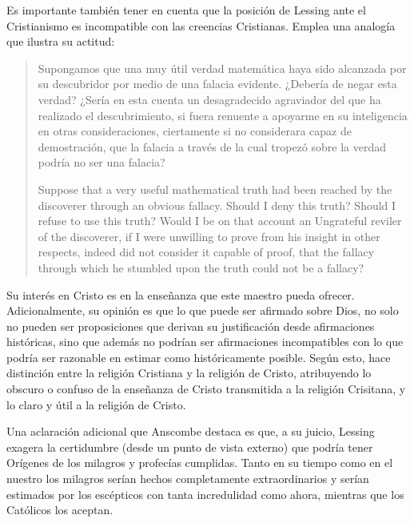 Es importante también tener en cuenta que la posición de Lessing ante el
Cristianismo es incompatible con las creencias Cristianas. Emplea una analogía
que ilustra su actitud: \blockquote[Suppose that a very useful mathematical
truth had been reached by the discoverer through an obvious fallacy. \textelp{}
Should I deny this truth? Should I refuse to use this truth? Would I be on that
account an Ungrateful reviler of the discoverer, if I were unwilling to prove
from his insight in other respects, indeed did not consider it capable of proof,
that the fallacy through which he stumbled upon the truth could not be a
fallacy?]{Supongamos que una muy útil verdad matemática haya sido alcanzada por
  su descubridor por medio de una falacia evidente. \textelp{} ¿Debería de negar
  esta verdad? ¿Sería en esta cuenta un desagradecido agraviador del que ha
  realizado el descubrimiento, si fuera renuente a apoyarme en su inteligencia
  en otras consideraciones, ciertamente si no considerara capaz de demostración,
  que la falacia a través de la cual tropezó sobre la verdad podría no ser una
  falacia?} Su interés en Cristo es en la enseñanza que este maestro pueda
ofrecer. Adicionalmente, su opinión es que lo que puede ser afirmado sobre Dios,
no solo no pueden ser proposiciones que derivan su justificación desde
afirmaciones históricas, sino que además no podrían ser afirmaciones
incompatibles con lo que podría ser razonable en estimar como históricamente
posible. Según esto, hace distinción entre la religión Cristiana y la religión
de Cristo, atribuyendo lo obscuro o confuso de la enseñanza de Cristo
transmitida a la religión Crisitana, y lo claro y útil a la religión de Cristo.

Una aclaración adicional que Anscombe destaca es que, a su juicio, Lessing
exagera la certidumbre (desde un punto de vista externo) que podría tener
Orígenes de los milagros y profecías cumplidas. Tanto en su tiempo como en el
nuestro los milagros serían hechos completamente extraordinarios y serían
estimados por los escépticos con tanta incredulidad como ahora, mientras que los
Católicos los aceptan.


